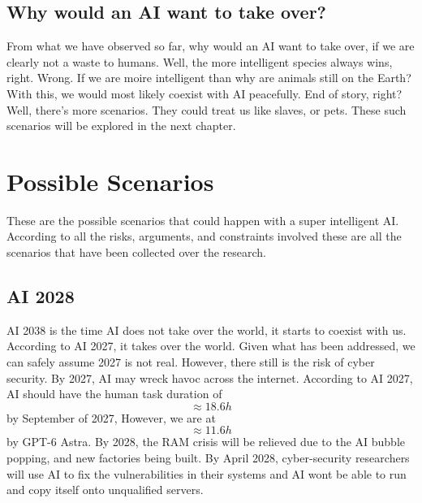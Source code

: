 \documentclass{report}
\begin{document}
	\section{Why would an AI want to take over?}
	From what we have observed so far, why would an AI want to take over, if we are clearly not a waste to humans. Well, the more intelligent species always wins, right. Wrong. If we are moire intelligent than why are animals still on the Earth? With this, we would most likely coexist with AI peacefully. End of story, right? Well, there's more scenarios. They could treat us like slaves, or pets.  These such scenarios will be explored in the next chapter.
	
	\chapter{Possible Scenarios}
	These are the possible scenarios that could happen with a super intelligent AI. According to all the risks, arguments, and constraints involved these are all the scenarios that have been collected over the research.
	
	\section{AI 2028}
	AI 2038 is the time AI does not take over the world, it starts to coexist with us. According to AI 2027, it takes over the world. Given what has been addressed, we can safely assume 2027 is not real. However, there still is the risk of cyber security. By 2027, AI may wreck havoc across the internet. According to AI 2027, AI should have the human task duration of $$\approx 18.6 h$$ by September of 2027, However, we are at $$\approx 11.6h$$ by GPT-6 Astra. By 2028, the RAM crisis will be relieved due to the AI bubble popping, and new factories being built. By April 2028, cyber-security researchers will use AI to fix the vulnerabilities in their systems and AI wont be able to run and copy itself onto unqualified servers.
	
\end{document}
